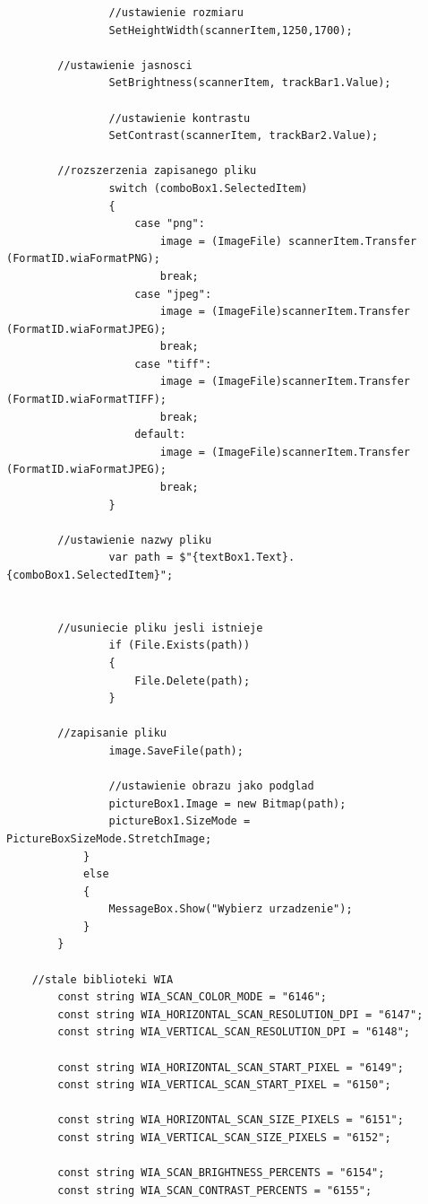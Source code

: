 \documentclass[12pt,a4paper,notitlepage]{report}
\begin{document}
\begin{adjustwidth}{0pt}{-50pt}
\begin{lstlisting}
                //ustawienie rozmiaru
                SetHeightWidth(scannerItem,1250,1700);
				
		//ustawienie jasnosci
                SetBrightness(scannerItem, trackBar1.Value);
                
                //ustawienie kontrastu
                SetContrast(scannerItem, trackBar2.Value);

		//rozszerzenia zapisanego pliku
                switch (comboBox1.SelectedItem)
                {
                    case "png":
                        image = (ImageFile) scannerItem.Transfer (FormatID.wiaFormatPNG);
                        break;
                    case "jpeg":
                        image = (ImageFile)scannerItem.Transfer (FormatID.wiaFormatJPEG);
                        break;
                    case "tiff":
                        image = (ImageFile)scannerItem.Transfer (FormatID.wiaFormatTIFF);
                        break;
                    default:
                        image = (ImageFile)scannerItem.Transfer (FormatID.wiaFormatJPEG);
                        break;
                }
				
		//ustawienie nazwy pliku
                var path = $"{textBox1.Text}.{comboBox1.SelectedItem}";
				
				
		//usuniecie pliku jesli istnieje
                if (File.Exists(path))
                {
                    File.Delete(path);
                }
				
		//zapisanie pliku
                image.SaveFile(path);
                
                //ustawienie obrazu jako podglad
                pictureBox1.Image = new Bitmap(path);
                pictureBox1.SizeMode = PictureBoxSizeMode.StretchImage;
            }
            else
            {
                MessageBox.Show("Wybierz urzadzenie");
            }
        }
		
	//stale biblioteki WIA
        const string WIA_SCAN_COLOR_MODE = "6146";
        const string WIA_HORIZONTAL_SCAN_RESOLUTION_DPI = "6147";
        const string WIA_VERTICAL_SCAN_RESOLUTION_DPI = "6148";

        const string WIA_HORIZONTAL_SCAN_START_PIXEL = "6149";
        const string WIA_VERTICAL_SCAN_START_PIXEL = "6150";

        const string WIA_HORIZONTAL_SCAN_SIZE_PIXELS = "6151";
        const string WIA_VERTICAL_SCAN_SIZE_PIXELS = "6152";

        const string WIA_SCAN_BRIGHTNESS_PERCENTS = "6154";
        const string WIA_SCAN_CONTRAST_PERCENTS = "6155";
       

\end{lstlisting}
\end{adjustwidth}
\end{document}
